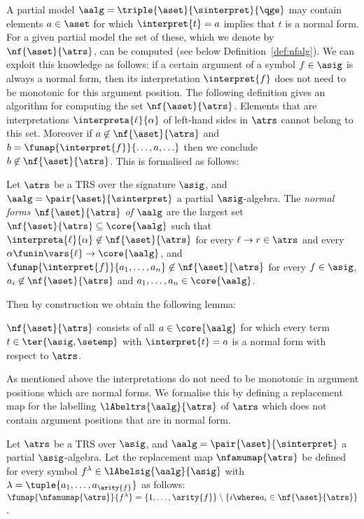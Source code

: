 A partial model $\aalg = \triple{\aset}{\sinterpret}{{\qge}}$
may contain elements $a \in \aset$
for which $\interpret{t} = a$ implies that $t$ is a normal form.
For a given partial model the set of these, which we denote by $\nf{\aset}{\atrs}$, can be computed (see below Definition~\ref{def:nfalg}).
We can exploit this knowledge as follows:
if a certain argument of a symbol $f \in \asig$
is always a normal form, then its interpretation $\interpret{f}$
does not need to be monotonic for this argument position.
The following definition gives an algorithm for computing the set $\nf{\aset}{\atrs}$.
Elements that are interpretations $\interpreta{\ell}{\alpha}$ of left-hand sides in $\atrs$
cannot belong to this set. Moreover if $a \not\in \nf{\aset}{\atrs}$
and $b = \funap{\interpret{f}}{\ldots,a,\ldots}$ then we conclude $b \not\in \nf{\aset}{\atrs}$.
This is formalised as follows:
\begin{definition}\normalfont\label{def:nfalg}
  Let $\atrs$ be a TRS over the signature $\asig$, and $\aalg = \pair{\aset}{\sinterpret}$ a partial $\asig$-algebra.
  The \emph{normal forms $\nf{\aset}{\atrs}$ of $\aalg$}
  are the largest set $\nf{\aset}{\atrs} \subseteq \core{\aalg}$ such that
  $\interpreta{\ell}{\alpha} \not\in \nf{\aset}{\atrs}$
  for every $\ell \to r \in \atrs$ and every $\alpha \funin \vars{\ell} \to \core{\aalg}$,
  and
  $\funap{\interpret{f}}{a_1,\ldots,a_n} \not\in \nf{\aset}{\atrs}$ 
  for every $f \in \asig$, $a_i \not\in \nf{\aset}{\atrs}$ and $a_1,\ldots,a_n \in \core{\aalg}$.
\end{definition}
Then by construction we obtain the following lemma:
\begin{lemma}\label{lem:nfalg}
  $\nf{\aset}{\atrs}$ consists of all $a \in \core{\aalg}$ 
  for which 
  every term $t \in \ter{\asig,\setemp}$ with $\interpret{t} = a$ is a normal form with respect to $\atrs$.
\end{lemma}
As mentioned above the interpretations do not need to be monotonic in argument positions
which are normal forms. We formalise this by defining a replacement map 
for the labelling $\lAbeltrs{\aalg}{\atrs}$ of $\atrs$ which does not contain
argument positions that are in normal form.
\begin{definition}\normalfont\label{def:qtransform}
  Let $\atrs$ be a TRS over $\asig$,
  and $\aalg = \pair{\aset}{\sinterpret}$ a partial $\asig$-algebra.
  Let the replacement map $\nfamumap{\atrs}$ be defined for 
  every symbol $f^{\lambda} \in \lAbelsig{\aalg}{\asig}$ with $\lambda = \tuple{a_1,\ldots,a_{\arity{f}}}$ as follows:
  $\funap{\nfamumap{\atrs}}{f^{\lambda}} = \{1,\ldots,\arity{f}\} \setminus \{i \where a_i \in \nf{\aset}{\atrs}\}$.
\end{definition}

